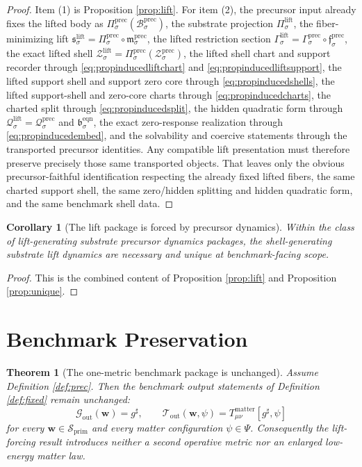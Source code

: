 \documentclass[11pt]{article}
\newcommand{\CompletedMetric}{g^{\sharp}}
\newcommand{\PrimShell}{\mathcal S_{\mathrm{prim}}}
\newcommand{\MetricOut}{\mathscr G_{\mathrm{out}}}
\newcommand{\MatterOut}{\mathscr T_{\mathrm{out}}}
\newcommand{\EqnPair}[1]{\mathfrak b_{#1}^{\mathrm{eqn}}}
\newcommand{\LiftProj}[1]{\Pi_{#1}^{\mathrm{lift}}}
\newcommand{\LiftSelect}[1]{\mathfrak s_{#1}^{\mathrm{lift}}}
\newcommand{\LiftSection}[1]{\Gamma_{#1}^{\mathrm{lift}}}
\newcommand{\LiftShellSet}[1]{\mathcal Z_{#1}^{\mathrm{lift}}}
\newcommand{\LiftCharge}[1]{\mathcal Q_{#1}^{\mathrm{lift}}}
\newcommand{\PrecBody}[1]{\mathcal B_{#1}^{\mathrm{prec}}}
\newcommand{\PrecProj}[1]{\Pi_{#1}^{\mathrm{prec}}}
\newcommand{\PrecLiftMin}[1]{\mathfrak f_{#1}^{\mathrm{prec}}}
\newcommand{\PrecSubMin}[1]{\mathfrak m_{#1}^{\mathrm{prec}}}
\newcommand{\PrecSection}[1]{\Gamma_{#1}^{\mathrm{prec}}}
\newcommand{\PrecShellSet}[1]{\mathcal Z_{#1}^{\mathrm{prec}}}
\newcommand{\PrecCharge}[1]{\mathcal Q_{#1}^{\mathrm{prec}}}
\newtheorem{corollary}{Corollary}
\newtheorem{theorem}{Theorem}
\begin{document}
\begin{proof}
Item (1) is Proposition \ref{prop:lift}. For item (2), the precursor input already fixes the lifted body as \(\PrecProj{\sigma}(\PrecBody{\sigma})\), the substrate projection \(\LiftProj{\sigma}\), the fiber-minimizing lift \(\LiftSelect{\sigma}=\PrecProj{\sigma}\circ\PrecSubMin{\sigma}\), the lifted restriction section \(\LiftSection{\sigma}=\PrecSection{\sigma}\circ\PrecLiftMin{\sigma}\), the exact lifted shell \(\LiftShellSet{\sigma}=\PrecProj{\sigma}(\PrecShellSet{\sigma})\), the lifted shell chart and support recorder through \eqref{eq:propinducedliftchart} and \eqref{eq:propinducedliftsupport}, the lifted support shell and support zero core through \eqref{eq:propinducedshells}, the lifted support-shell and zero-core charts through \eqref{eq:propinducedcharts}, the charted split through \eqref{eq:propinducedsplit}, the hidden quadratic form through \(\LiftCharge{\sigma}=\PrecCharge{\sigma}\) and \(\EqnPair{\sigma}\), the exact zero-response realization through \eqref{eq:propinducedembed}, and the solvability and coercive statements through the transported precursor identities. Any compatible lift presentation must therefore preserve precisely those same transported objects. That leaves only the obvious precursor-faithful identification respecting the already fixed lifted fibers, the same charted support shell, the same zero/hidden splitting and hidden quadratic form, and the same benchmark shell data.
\end{proof}

\begin{corollary}[The lift package is forced by precursor dynamics]
\label{cor:forced}
Within the class of lift-generating substrate precursor dynamics packages, the shell-generating substrate lift dynamics are necessary and unique at benchmark-facing scope.
\end{corollary}

\begin{proof}
This is the combined content of Proposition \ref{prop:lift} and Proposition \ref{prop:unique}.
\end{proof}

\section{Benchmark Preservation}

\begin{theorem}[The one-metric benchmark package is unchanged]
\label{thm:outputs}
Assume Definition \ref{def:prec}. Then the benchmark output statements of Definition \ref{def:fixed} remain unchanged:
\[
\MetricOut(\mathbf w)=\CompletedMetric,
\qquad
\MatterOut(\mathbf w,\psi)
=
T_{\mu\nu}^{\mathrm{matter}}[\CompletedMetric,\psi]
\]
for every \(\mathbf w\in\PrimShell\) and every matter configuration \(\psi\in\Psi\). Consequently the lift-forcing result introduces neither a second operative metric nor an enlarged low-energy matter law.
\end{theorem}
\end{document}
